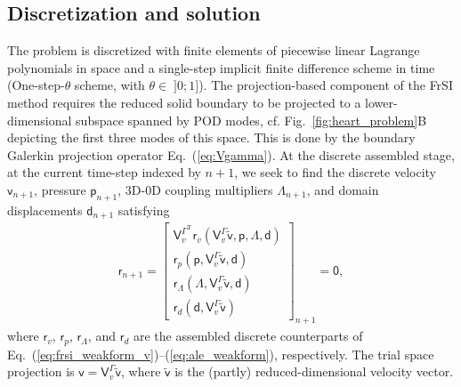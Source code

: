\subsection*{Discretization and solution}
The problem is discretized with finite elements of piecewise linear Lagrange polynomials in space and a single-step implicit finite difference scheme in time (One-step-$\theta$ scheme, with $\theta\in\;]0; 1]$).
The projection-based component of the FrSI method requires the reduced solid boundary to be projected to a lower-dimensional subspace spanned by POD modes, cf. Fig.~\ref{fig:heart_problem}B depicting the first three modes of this space. This is done by the boundary Galerkin projection operator Eq.~(\ref{eq:Vgamma}).
At the discrete assembled stage, at the current time-step indexed by $n+1$, we seek to find the discrete velocity $\boldsymbol{\mathsf{v}}_{n+1}$, pressure $\boldsymbol{\mathsf{p}}_{n+1}$, 3D-0D coupling multipliers $\boldsymbol{\mathsf{\Lambda}}_{n+1}$, and domain displacements $\boldsymbol{\mathsf{d}}_{n+1}$ satisfying
\begin{align}
    \boldsymbol{\mathsf{r}}_{n+1} = \begin{bmatrix} 
                  \boldsymbol{\mathsf{V}}_{v}^{\mathit{\Gamma}^\mathrm{T}}\boldsymbol{\mathsf{r}}_{v}(\boldsymbol{\mathsf{V}}_{v}^{\mathit{\Gamma}}\tilde{\boldsymbol{\mathsf{v}}},\boldsymbol{\mathsf{p}},\boldsymbol{\mathsf{\Lambda}},\boldsymbol{\mathsf{d}}) \\
                  \boldsymbol{\mathsf{r}}_{p}(\boldsymbol{\mathsf{p}},\boldsymbol{\mathsf{V}}_{v}^{\mathit{\Gamma}}\tilde{\boldsymbol{\mathsf{v}}},\boldsymbol{\mathsf{d}}) \\ 
                  \boldsymbol{\mathsf{r}}_{\mathit{\Lambda}} (\boldsymbol{\mathsf{\Lambda}},\boldsymbol{\mathsf{V}}_{v}^{\mathit{\Gamma}}\tilde{\boldsymbol{\mathsf{v}}},\boldsymbol{\mathsf{d}}) \\ 
                  \boldsymbol{\mathsf{r}}_{d} (\boldsymbol{\mathsf{d}},\boldsymbol{\mathsf{V}}_{v}^{\mathit{\Gamma}}\tilde{\boldsymbol{\mathsf{v}}})
               \end{bmatrix}_{n+1}
               = 
               \boldsymbol{\mathsf{0}},
               \label{eq:res_nonlin_frsi}
\end{align}
where $\boldsymbol{\mathsf{r}}_{v}$, $\boldsymbol{\mathsf{r}}_{p}$, $\boldsymbol{\mathsf{r}}_{\mathit{\Lambda}}$, and $\boldsymbol{\mathsf{r}}_{d}$ are the assembled discrete counterparts of Eq.~(\ref{eq:frsi_weakform_v})--(\ref{eq:ale_weakform}), respectively. 
The trial space projection is $\boldsymbol{\mathsf{v}} = \boldsymbol{\mathsf{V}}_{v}^{\mathit{\Gamma}} \tilde{\boldsymbol{\mathsf{v}}}$, where $\tilde{\boldsymbol{\mathsf{v}}}$ is the (partly) reduced-dimensional velocity vector.
